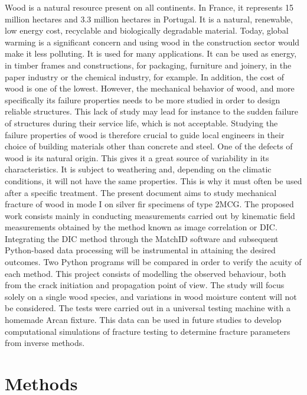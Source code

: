 \documentclass[3p,times,procedia]{elsarticle}
\begin{document}
Wood is a natural resource present on all continents. In France, it represents 15 million hectares and 3.3 million hectares in Portugal. It is a natural, renewable, low energy cost, recyclable and biologically degradable material. Today, global warming is a significant concern and using wood in the construction sector would make it less polluting. It is used for many applications. It can be used as energy, in timber frames and constructions, for packaging, furniture and joinery, in the paper industry or the chemical industry, for example. In addition, the cost of wood is one of the lowest. However, the mechanical behavior of wood, and more specifically its failure properties needs to be more studied in order to design reliable structures. This lack of study may lead for instance to the sudden failure of structures during their service life, which is not acceptable. Studying the failure properties of wood is therefore crucial to guide local engineers in their choice of building materials other than concrete and steel. One of the defects of wood is its natural origin. This gives it a great source of variability in its characteristics. It is subject to weathering and, depending on the climatic conditions, it will not have the same properties. This is why it must often be used after a specific treatment.
The present document aims to study mechanical fracture of wood in mode I on silver fir specimens of type 2MCG. The proposed work consists mainly in conducting measurements carried out by kinematic field measurements obtained by the method known as image correlation or DIC. Integrating the DIC method through the MatchID software and subsequent Python-based data processing will be instrumental in attaining the desired outcomes. Two Python programs will be compared in order to verify the acuity of each method. This project consists of modelling the observed behaviour, both from the crack initiation and propagation point of view. The study will focus solely on a single wood species, and variations in wood moisture content will not be considered. The tests were carried out in a universal testing machine with a homemade Arcan fixture. This data can be used in future studies to develop computational simulations of fracture testing to determine fracture parameters from inverse methods.


\section{Methods}\label{S:method}
\end{document}
